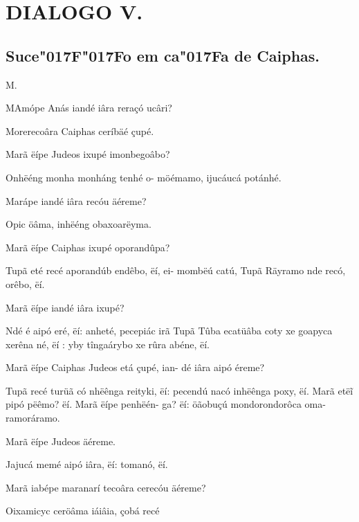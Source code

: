 \documentclass[openany,titlepage,12pt]{book}
\renewcommand{\chaptermark}[1]{\markboth{#1}{}}
\renewcommand{\sectionmark}[1]{\gdef\rightmark{#1}}
\newcommand{\lgS}{\char"017F}
\newcommand{\lgSS}{\char"017F\char"017F}
\newcommand{\comecalista}[5]{
    \hspace*{-11.7pt}
    \begin{minipage}[t]{0.08\linewidth}
        \flushright #1\\#2
    \end{minipage}
    \hspace{0pt}
    \begin{minipage}[t]{0.94\linewidth}
        \lettrine
        [findent =2pt, nindent=0pt,  lines=2]
        {#3}{#4}#5
    \end{minipage}
    \vspace*{-3pt}
}
\begin{document}
\section{DIALOGO V.}
\subsection{Suce\lgSS o em ca\lgS a de Caiphas.}

\chaptermark{Dialogo V.}
\sectionmark{Suce\lgSS o com Caiphas.}
\vspace*{2pt}

\comecalista{M.}{}{M}{A}
{mópe Anás iandé iâra reraçó
    \hspace*{2ex}ucâri?
    }

\begin{altereven}
    \item Morerecoâra Caiphas ceríbäé çupé.
    \item Marã ëípe Judeos ixupé imonbegoâbo?
    \item Onhëéng monha monháng tenhé o-
        möémamo, ijucáucá potánhé.
    \item Marápe iandé iâra recóu äéreme?
    \item Opic öâma, inhëéng obaxoarëyma.
    \item Marã ëípe Caiphas ixupé oporandûpa?
    \item Tupã eté recé aporandúb endêbo, ëí, ei-
        mombëú catú, Tupã Räyramo nde recó,
        orêbo, ëí.
    \item Marã ëípe iandé iâra ixupé?
    \item Ndé é aipó eré, ëí: anheté, pecepiác irã
        Tupã Tûba ecatüâba coty xe goapyca
        xerêna né, ëí : yby tîngaárybo xe rûra
        abéne, ëí.
    \item Marã ëípe Caiphas Judeos etá çupé, ian-
        dé iâra aipó éreme?
    \item Tupã recé turüã có nhëênga reityki, ëí:
        pecendú nacó inhëênga poxy, ëí. Marã
        etë\~i pipó pëêmo? ëí. Marã ëípe penhëén-
        ga? ëí: öãobuçú mondorondorôca oma-
        ramoráramo.
    \item Marã ëípe Judeos äéreme.
    \item Jajucá memé aipó iâra, ëí: tomanó, ëí.
    \item Marã iabépe maranarí tecoâra cerecóu
        äéreme?
    \item Oixamicyc ceröâma iáiâia, çobá recé \linebreak

\end{altereven}
\end{document}
